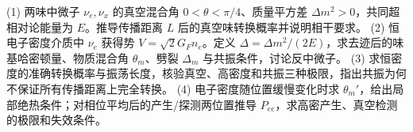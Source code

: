 (1) 两味中微子 \(\nu_e,\nu_x\) 的真空混合角 \(0<\theta<\pi/4\)、质量平方差 \(\Delta m^2>0\)，共同超相对论能量为 \(E\)。推导传播距离 \(L\) 后的真空味转换概率并说明相干要求。
(2) 恒电子密度介质中 \(\nu_e\) 获得势 \(V=\sqrt2G_Fn_e\)。定义 \(\Delta=\Delta m^2/(2E)\)，求去迹后的味基哈密顿量、物质混合角 \(\theta_m\)、劈裂 \(\Delta_m\) 与共振条件，讨论反中微子。
(3) 求恒密度的准确转换概率与振荡长度，核验真空、高密度和共振三种极限，指出共振为何不保证所有传播距离上完全转换。
(4) 电子密度随位置缓慢变化时求 \(\theta_m'\)，给出局部绝热条件；对相位平均后的产生/探测两位置推导 \(P_{ee}\)，求高密产生、真空检测的极限和失效条件。
